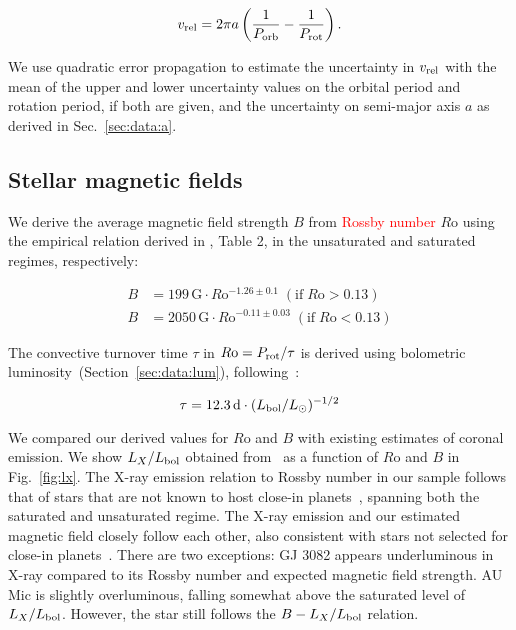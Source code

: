 \documentclass[twocolumn]{aastex631}
\begin{document}
\begin{equation}
    v_{\rm rel} = 2 \pi a \left(\frac{1}{P_{\rm orb}} - \frac{1}{P_{\rm rot}}\right).
\end{equation}

We use quadratic error propagation to estimate the uncertainty in $v_{\rm rel}$ with the mean of the upper and lower uncertainty values on the orbital period and rotation period, if both are given, and the uncertainty on semi-major axis $a$ as derived in Sec.~\ref{sec:data:a}. 

\subsection{Stellar magnetic fields}
\label{sec:methods:bfield}
We derive the average magnetic field strength $B$ from \textcolor{red}{Rossby number} $R$o using the empirical relation derived in \citet{reiners2022magnetism},  Table 2, in the unsaturated and saturated regimes, respectively:

\begin{eqnarray}
    B &= 199\,\text{G} \cdot R\mathrm{o}^{-1.26\pm 0.1} \;(\text{if}\; R\mathrm{o} > 0.13) \label{Eq3}\\
    B &= 2050\,\text{G} \cdot R\mathrm{o}^{-0.11\pm 0.03} \;(\text{if}\; R\mathrm{o} < 0.13) \label{Eq4}
\end{eqnarray} 

The convective turnover time $\tau$ in  $R \mathrm{o}=P_{\rm rot}/\tau$ is derived using bolometric luminosity~(Section~\ref{sec:data:lum}), following~\citet{reiners2014generalized, reiners2022magnetism}:

\begin{equation}
    \tau = 12.3\, \mathrm{d} \cdot (L_{\rm bol}/L_\odot)^{-1/2}
\end{equation}

We compared our derived values for $R$o and $B$ with existing estimates of coronal emission. We show $L_X/L_{\rm bol}$ obtained from~\citet{foster2022exoplanet} as a function of $R$o and $B$ in Fig.~\ref{fig:lx}. The X-ray emission relation to Rossby number in our sample follows that of stars that are not known to host close-in planets~\citep{wright2011stellaractivityrotation}, spanning both the saturated and unsaturated regime. The X-ray emission and our estimated magnetic field closely follow each other, also consistent with stars not selected for close-in planets~\citep{reiners2022magnetism}. There are two exceptions: GJ 3082 appears underluminous in X-ray compared to its Rossby number and expected magnetic field strength. AU Mic is slightly overluminous, falling somewhat above the saturated level of $L_X/L_{\rm bol}$. However, the star still follows the $B-L_X/L_{\rm bol}$ relation.  
\end{document}
